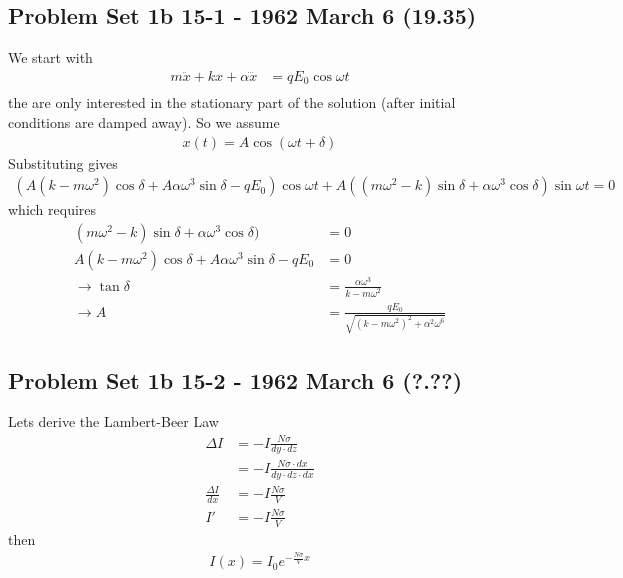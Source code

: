 \documentclass[10pt,a4paper]{book}
\theoremstyle{definition}
\begin{document}
\subsection{Problem Set 1b  15-1 - 1962 March 6 (19.35)}
We start with
\begin{align}
m\ddot{x}+kx+\alpha\dddot{x}&=qE_0\cos\omega t\\
\end{align}
the are only interested in the stationary part of the solution (after initial conditions are damped away). So we assume
\begin{align}
x(t)=A\cos(\omega t+\delta)
\end{align}
Substituting gives
\begin{align}
(A(k-m\omega^2)\cos\delta+A\alpha\omega^3\sin\delta-qE_0)\cos\omega t+A((m\omega^2-k)\sin\delta+\alpha\omega^3\cos\delta)\sin\omega t=0
\end{align}
which requires
\begin{align}
(m\omega^2-k)\sin\delta+\alpha\omega^3\cos\delta)&=0\\
A(k-m\omega^2)\cos\delta+A\alpha\omega^3\sin\delta-qE_0&=0\\
\rightarrow \tan\delta&=\frac{\alpha\omega^3}{k-m\omega^2}\\
\rightarrow A&=\frac{qE_0}{\sqrt{(k-m\omega^2)^2+\alpha^2\omega^6}}
\end{align}



\subsection{Problem Set 1b  15-2 - 1962 March 6 (?.??)}
Lets derive the Lambert-Beer Law
\begin{align}
\Delta I
&=-I \frac{N\sigma}{dy\cdot dz}\\
&=-I \frac{N\sigma\cdot dx}{dy\cdot dz\cdot dx}\\
\frac{\Delta I}{dx}&=-I\frac{N\sigma}{V}\\
I'&=-I\frac{N\sigma}{V}
\end{align}
then
\begin{align}
I(x)=I_0e^{-\frac{N\sigma}{V}x}
\end{align}
\end{document}
